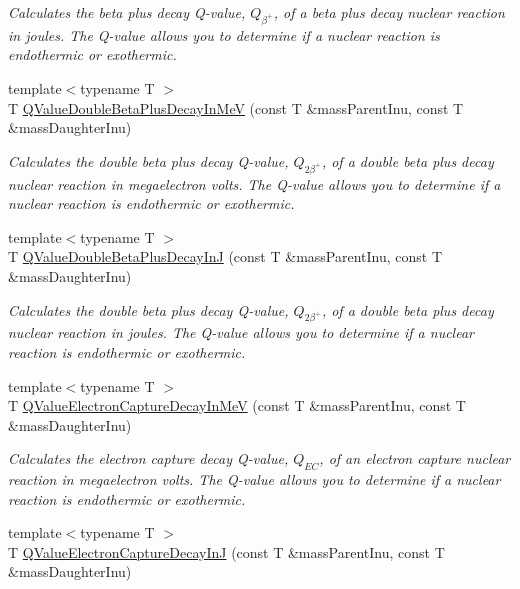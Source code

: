 \begin{DoxyCompactItemize}
\begin{DoxyCompactList}\small\item\em Calculates the beta plus decay Q-\/value, $Q_{\beta^+}$, of a beta plus decay nuclear reaction in joules. The Q-\/value allows you to determine if a nuclear reaction is endothermic or exothermic. \end{DoxyCompactList}\item 
{\footnotesize template$<$typename T $>$ }\\T \hyperlink{group___q_value_ga3fb4b374bc1df69b96a66d0488bb2ba1}{Q\+Value\+Double\+Beta\+Plus\+Decay\+In\+MeV} (const T \&mass\+Parent\+Inu, const T \&mass\+Daughter\+Inu)
\begin{DoxyCompactList}\small\item\em Calculates the double beta plus decay Q-\/value, $Q_{2\beta^+}$, of a double beta plus decay nuclear reaction in megaelectron volts. The Q-\/value allows you to determine if a nuclear reaction is endothermic or exothermic. \end{DoxyCompactList}\item 
{\footnotesize template$<$typename T $>$ }\\T \hyperlink{group___q_value_ga7d8dcc2691c2d4de9132e758e149ba51}{Q\+Value\+Double\+Beta\+Plus\+Decay\+InJ} (const T \&mass\+Parent\+Inu, const T \&mass\+Daughter\+Inu)
\begin{DoxyCompactList}\small\item\em Calculates the double beta plus decay Q-\/value, $Q_{2\beta^+}$, of a double beta plus decay nuclear reaction in joules. The Q-\/value allows you to determine if a nuclear reaction is endothermic or exothermic. \end{DoxyCompactList}\item 
{\footnotesize template$<$typename T $>$ }\\T \hyperlink{group___q_value_ga9a6b76207e2ec60fd0ee3511582f9e26}{Q\+Value\+Electron\+Capture\+Decay\+In\+MeV} (const T \&mass\+Parent\+Inu, const T \&mass\+Daughter\+Inu)
\begin{DoxyCompactList}\small\item\em Calculates the electron capture decay Q-\/value, $Q_{EC}$, of an electron capture nuclear reaction in megaelectron volts. The Q-\/value allows you to determine if a nuclear reaction is endothermic or exothermic. \end{DoxyCompactList}\item 
{\footnotesize template$<$typename T $>$ }\\T \hyperlink{group___q_value_ga7b523a7d197beb91dcda75ddde12c851}{Q\+Value\+Electron\+Capture\+Decay\+InJ} (const T \&mass\+Parent\+Inu, const T \&mass\+Daughter\+Inu)

\end{DoxyCompactItemize}
